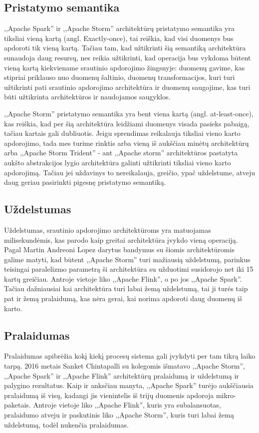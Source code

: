 \documentclass{VUMIFPSkursinis}
\begin{document}
\subsection{Pristatymo semantika}
,,Apache Spark'' ir ,,Apache Storm'' architektūrų pristatymo semantika yra tiksliai vieną kartą (angl. Exactly-once), tai reiškia, kad visi 
duomenys bus apdoroti tik vieną kartą. Tačiau tam, kad užtikrinti šią semantiką architektūra sunaudoja daug resursų, nes reikia užtikrinti, kad 
operacija bus vykdoma būtent vieną kartą kiekviename srautinio apdorojimo žingsnyje: duomenų gavime, kas stipriai priklauso nuo duomenų šaltinio,
duomenų transformacijos, kuri turi užtikrinti pati srautinio apdorojimo architektūra ir duomenų saugojime, kas turi būti užtikrinta architektūros ir
naudojamos saugyklos\cite{zhang20}.\par
    ,,Apache Storm'' pristatymo semantika yra bent viena kartą (angl. at-least-once), kas reiškia, kad per šią architektūra leidžiami duomenys 
visada pasieks pabaigą, tačiau kartais gali dubliuotis\cite{prithi20}. Jeigu sprendimas reikalauja tiksliai vieno karto apdorojimo, tada mes turime rinktis arba vieną 
iš aukščiau minėtų architektūrų arba ,,Apache Storm Trident'' - ant ,,Apache storm'' architektūros pastatyta aukšto abstrakcijos lygio architektūra 
galinti užtikrinti tiksliai vieno karto apdorojimą. Tačiau jei uždavinys to nereikalauja, greičio, ypač uždelstume, atveju daug geriau pasirinkti 
pigesnę pristatymo semantiką\cite{zhang20}.
\subsection{Uždelstumas}
    Uždelstumas, srautinio apdorojimo architektūroms yra matuojamas milisekundėmis, kas parodo kaip greitai architektūra įvykdo vieną operaciją. 
Pagal Martin Andreoni Lopez darytus bandymus su šiomis architektūromis galime matyti, kad būtent ,,Apache Storm'' turi mažiausią uždelstumą,
parinkus teisingai paralelizmo parametrą ši architektūra su užduotimi susidorojo net iki 15 kartų greičiau. Antroje vietoje liko ,,Apache Flink'', o po jos
,,Apache Spark''\cite{Lopez2016APC}. Tačiau dažniausiai kai architektūra turi labai žemą uždelstumą, tai ji turės taip pat ir žemą pralaidumą, kas nėra gerai, kai norima apdoroti daug duomenų iš karto.

\subsection{Pralaidumas}
    Pralaidumas apibrėžia kokį kiekį procesų sistema gali įvykdyti per tam tikrą laiko tarpą. 2016 metais Sanket Chintapalli su kolegomis išmatavo ,,Apache Storm'',
,,Apache Spark'' ir ,,Apache Flink'' architektūrų pralaidumą ir uždelstumą ir palygino rezultatus. Kaip ir anksčiau manyta, ,,Apache Spark'' turėjo aukščiausia 
pralaidumą iš visų, kadangi jis vienintelis iš trijų duomenis apdoroja mikro-paketais. Antroje vietoje liko ,,Apache Flink'', kuris yra subalansuotas,
pralaidumo atveju ir paskutinis liko ,,Apache Storm'', kuris turi labai žemą uždelstumą, todėl nukenčia pralaidumas\cite{chintapalli2016benchmarking}.
\end{document}
